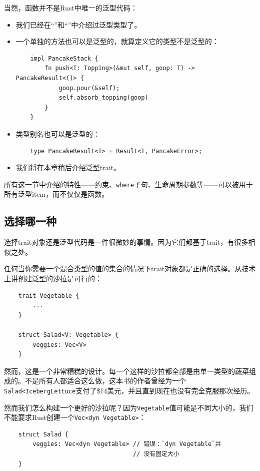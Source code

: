 当然，函数并不是Rust中唯一的泛型代码：
\begin{itemize}
    \item 我们已经在“”和“”中介绍过泛型类型了。
    \item 一个单独的方法也可以是泛型的，就算定义它的类型不是泛型的：
    \begin{verbatim}
    impl PancakeStack {
        fn push<T: Topping>(&mut self, goop: T) -> PancakeResult<()> {
            goop.pour(&self);
            self.absorb_topping(goop)
        }
    }
    \end{verbatim}
    \item 类型别名也可以是泛型的：
    \begin{verbatim}
    type PancakeResult<T> = Result<T, PancakeError>;
    \end{verbatim}
    \item 我们将在本章稍后介绍泛型trait。
\end{itemize}

所有这一节中介绍的特性——约束、\texttt{where}子句、生命周期参数等——可以被用于所有泛型item，而不仅仅是函数。

\subsection{选择哪一种}\label{WhichToUse}
选择trait对象还是泛型代码是一件很微妙的事情。因为它们都基于trait，有很多相似之处。

任何当你需要一个混合类型的值的集合的情况下trait对象都是正确的选择。从技术上讲创建泛型的沙拉是可行的：
\begin{verbatim}
    trait Vegetable {
        ...
    }

    struct Salad<V: Vegetable> {
        veggies: Vec<V>
    }
\end{verbatim}

然而，这是一个非常糟糕的设计。每一个这样的沙拉都全部是由单一类型的蔬菜组成的。不是所有人都适合这么做，这本书的作者曾经为一个\texttt{Salad<IcebergLettuce}支付了\$14美元，并且直到现在也没有完全克服那次经历。

然而我们怎么构建一个更好的沙拉呢？因为\texttt{Vegetable}值可能是不同大小的，我们不能要求Rust创建一个\texttt{Vec<dyn Vegetable>}：
\begin{verbatim}
    struct Salad {
        veggies: Vec<dyn Vegetable> // 错误：`dyn Vegetable`并
                                    // 没有固定大小
    }
\end{verbatim}

